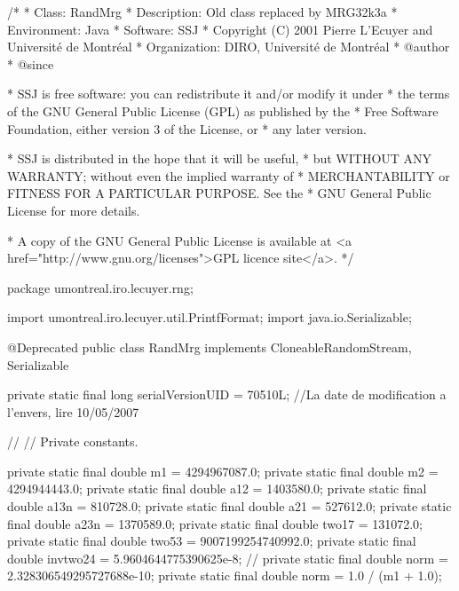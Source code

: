 \begin{code}
\begin{hide}
/*
 * Class:        RandMrg
 * Description:  Old class replaced by MRG32k3a
 * Environment:  Java
 * Software:     SSJ 
 * Copyright (C) 2001  Pierre L'Ecuyer and Université de Montréal
 * Organization: DIRO, Université de Montréal
 * @author       
 * @since

 * SSJ is free software: you can redistribute it and/or modify it under
 * the terms of the GNU General Public License (GPL) as published by the
 * Free Software Foundation, either version 3 of the License, or
 * any later version.

 * SSJ is distributed in the hope that it will be useful,
 * but WITHOUT ANY WARRANTY; without even the implied warranty of
 * MERCHANTABILITY or FITNESS FOR A PARTICULAR PURPOSE.  See the
 * GNU General Public License for more details.

 * A copy of the GNU General Public License is available at
   <a href="http://www.gnu.org/licenses">GPL licence site</a>.
 */
\end{hide}
package umontreal.iro.lecuyer.rng; \begin{hide}

import umontreal.iro.lecuyer.util.PrintfFormat;
import java.io.Serializable;
\end{hide}

@Deprecated
public class RandMrg implements CloneableRandomStream, Serializable\begin{hide} {

   private static final long serialVersionUID = 70510L;
   //La date de modification a l'envers, lire 10/05/2007

// %
// Private constants.

   private static final double m1     = 4294967087.0;
   private static final double m2     = 4294944443.0;
   private static final double a12    =  1403580.0;
   private static final double a13n   =   810728.0;
   private static final double a21    =   527612.0;
   private static final double a23n   =   1370589.0;
   private static final double two17    =  131072.0;
   private static final double two53    =  9007199254740992.0;
   private static final double invtwo24 = 5.9604644775390625e-8;
//   private static final double norm   = 2.328306549295727688e-10;
   private static final double norm   = 1.0 / (m1 + 1.0);

}
\end{hide}
\end{code}
